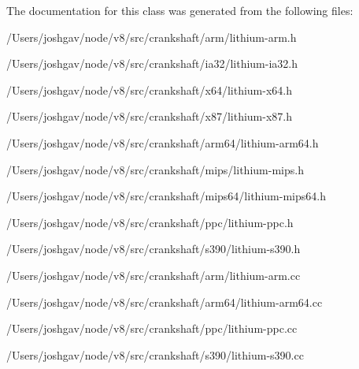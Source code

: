 The documentation for this class was generated from the following files\+:\begin{DoxyCompactItemize}
\item 
/\+Users/joshgav/node/v8/src/crankshaft/arm/lithium-\/arm.\+h\item 
/\+Users/joshgav/node/v8/src/crankshaft/ia32/lithium-\/ia32.\+h\item 
/\+Users/joshgav/node/v8/src/crankshaft/x64/lithium-\/x64.\+h\item 
/\+Users/joshgav/node/v8/src/crankshaft/x87/lithium-\/x87.\+h\item 
/\+Users/joshgav/node/v8/src/crankshaft/arm64/lithium-\/arm64.\+h\item 
/\+Users/joshgav/node/v8/src/crankshaft/mips/lithium-\/mips.\+h\item 
/\+Users/joshgav/node/v8/src/crankshaft/mips64/lithium-\/mips64.\+h\item 
/\+Users/joshgav/node/v8/src/crankshaft/ppc/lithium-\/ppc.\+h\item 
/\+Users/joshgav/node/v8/src/crankshaft/s390/lithium-\/s390.\+h\item 
/\+Users/joshgav/node/v8/src/crankshaft/arm/lithium-\/arm.\+cc\item 
/\+Users/joshgav/node/v8/src/crankshaft/arm64/lithium-\/arm64.\+cc\item 
/\+Users/joshgav/node/v8/src/crankshaft/ppc/lithium-\/ppc.\+cc\item 
/\+Users/joshgav/node/v8/src/crankshaft/s390/lithium-\/s390.\+cc\end{DoxyCompactItemize}

